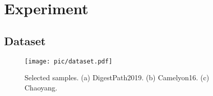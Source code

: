 \section{Experiment}
\label{sec:experiment}


\subsection{Dataset}
\label{sec:data}

\begin{figure}[hbt]
  \centering
  \texttt{[image: pic/dataset.pdf]}
\caption{Selected samples. (a) DigestPath2019. (b) Camelyon16. (c) Chaoyang.}
  \label{fig:dataset}
\end{figure}





















